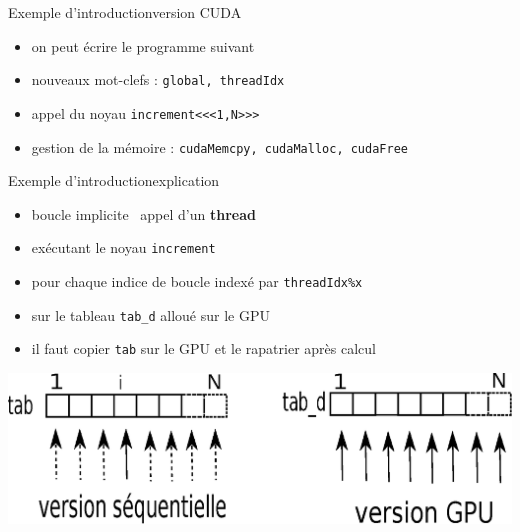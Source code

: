 \documentclass[11pt,mathserif]{beamer}
\newcommand{\gezi}{\faLongArrowRight}
\newcommand{\argi}{\faLightbulbO}
\newcommand{\kontuz}{\faExclamationTriangle}
\newcommand{\pozik}{\faSmileO}
\newcommand{\adibi}{\faCommentO}
\newif\ifC
\newcommand{\extcu}{cu}
\newcommand{\extcu}{cuf}
\newcommand{\includeSrcCu}[1]{}
\begin{document}
\begin{frame}{Exemple d'introduction}{version CUDA}
\pause
\begin{itemize}[<+->]
  \item[\adibi] on peut écrire le programme suivant
\includeSrcCu{code/increment}
\ifC \item[\pozik] plus de boucle \fi
\item[\argi] nouveaux mot-clefs : \ifC \texttt{\_\_global\_\_, threadIdx} \else
\texttt{global, threadIdx} \fi
\item[\argi] appel du noyau \texttt{increment<<<1,N>>>}
\item[\argi] gestion de la mémoire : \texttt{\small cudaMemcpy, cudaMalloc, cudaFree}
\end{itemize}
\end{frame}

\begin{frame}{Exemple d'introduction}{explication}
\pause
\begin{itemize}[<+->]
\ifC
 \item[\argi] boucle \texttt{for} \gezi\ appel d'un {\bf thread}
\else
 \item[\argi] boucle implicite \gezi\ appel d'un {\bf thread}
\fi
 \item[\argi] exécutant le noyau \texttt{increment}
 \item[\argi] pour chaque indice de boucle indexé par \ifC \texttt{threadIdx.x} \else 
   \texttt{threadIdx\%x} \fi
 \item[\argi] sur le tableau \texttt{tab\_d} alloué sur le GPU
 \item[\kontuz] il faut copier \texttt{tab} sur le GPU et le rapatrier après calcul
\end{itemize}
\pause
\begin{center}
\includegraphics[width=0.9\linewidth]{fig/parallel.eps}
\end{center}
\end{frame}
\end{document}
